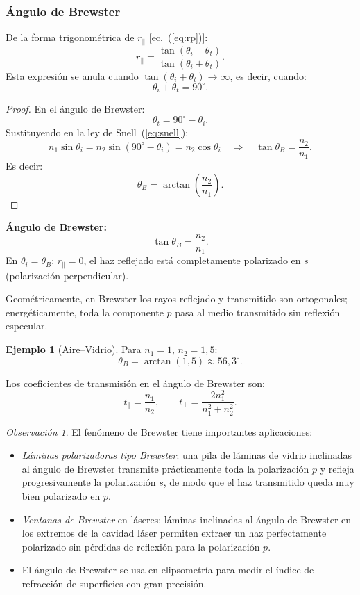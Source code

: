 \documentclass[12pt, a4paper]{article}
\theoremstyle{plain}
\theoremstyle{definition}
\newtheorem{ejemplo}{Ejemplo}[section]
\theoremstyle{remark}
\newtheorem*{observacion}{Observación}
\begin{document}
\subsubsection{Ángulo de Brewster}

De la forma trigonométrica de $r_\parallel$ [ec.~(\ref{eq:rp})]:
\[
  r_\parallel = \frac{\tan(\theta_i - \theta_t)}{\tan(\theta_i + \theta_t)}.
\]
Esta expresión se anula cuando $\tan(\theta_i + \theta_t) \to \infty$, es
decir, cuando:
\[
  \theta_i + \theta_t = 90^{\circ}.
\]

\begin{proof}
En el ángulo de Brewster:
\[
  \theta_t = 90^{\circ} - \theta_i.
\]
Sustituyendo en la ley de Snell~(\ref{eq:snell}):
\[
  n_1\sin\theta_i = n_2\sin(90^{\circ} - \theta_i) = n_2\cos\theta_i
  \quad\Rightarrow\quad
  \tan\theta_B = \frac{n_2}{n_1}.
\]
Es decir:
\[
  \theta_B=\arctan\!\left(\frac{n_2}{n_1}\right).
\]
\end{proof}

\begin{mdframed}[style=resultado]
\textbf{Ángulo de Brewster:}
\begin{equation}
  \tan\theta_B = \frac{n_2}{n_1}.
  \label{eq:brewster}
\end{equation}
En $\theta_i = \theta_B$: $r_\parallel = 0$, el haz reflejado está
completamente polarizado en $s$ (polarización perpendicular).
\end{mdframed}

Geométricamente, en Brewster los rayos reflejado y transmitido son
ortogonales; energéticamente, toda la componente $p$ pasa al medio transmitido
sin reflexión especular.

\begin{ejemplo}[Aire--Vidrio]
Para $n_1 = 1$, $n_2 = 1{,}5$:
\[
  \theta_B = \arctan(1{,}5) \approx 56{,}3^{\circ}.
\]
\end{ejemplo}

Los coeficientes de transmisión en el ángulo de Brewster son:
\[
  t_\parallel = \frac{n_1}{n_2}, \qquad
  t_\perp = \frac{2n_1^2}{n_1^2 + n_2^2}.
\]

\begin{observacion}
El fenómeno de Brewster tiene importantes aplicaciones:
\begin{itemize}
  \item \emph{Láminas polarizadoras tipo Brewster}: una pila de láminas de
        vidrio inclinadas al ángulo de Brewster transmite prácticamente toda
        la polarización $p$ y refleja progresivamente la polarización $s$, de
        modo que el haz transmitido queda muy bien polarizado en $p$.
  \item \emph{Ventanas de Brewster} en láseres: láminas inclinadas al ángulo
        de Brewster en los extremos de la cavidad láser permiten extraer un haz
        perfectamente polarizado sin pérdidas de reflexión para la polarización $p$.
  \item El ángulo de Brewster se usa en elipsometría para medir el índice de
        refracción de superficies con gran precisión.
\end{itemize}
\end{observacion}
\end{document}
